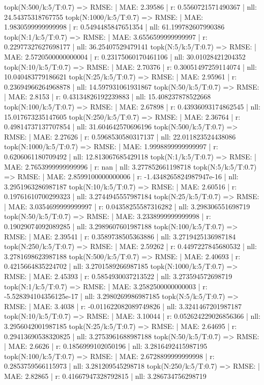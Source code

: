 topk(N:500/k:5/T:0.7) => RMSE: | MAE: 2.39586 | r: 0.5560721571490367 | nll: 24.54375318767755
topk(N:1000/k:5/T:0.7) => RMSE: | MAE: 1.9830599999999998 | r: 0.5494485847651354 | nll: 61.199782607990386
topk(N:1/k:5/T:0.7) => RMSE: | MAE: 3.6556599999999997 | r: 0.22977327627698177 | nll: 36.25407529479141
topk(N:5/k:5/T:0.7) => RMSE: | MAE: 2.5720500000000004 | r: 0.23175060170461106 | nll: 30.01028421204352
topk(N:10/k:5/T:0.7) => RMSE: | MAE: 2.70376 | r: 0.30051497259114074 | nll: 10.040483779186621
topk(N:25/k:5/T:0.7) => RMSE: | MAE: 2.95961 | r: 0.23694966264968878 | nll: 14.597931061931867
topk(N:50/k:5/T:0.7) => RMSE: | MAE: 2.8153 | r: 0.43134826192239883 | nll: 15.408237878522668
topk(N:100/k:5/T:0.7) => RMSE: | MAE: 2.67898 | r: 0.43936093174862545 | nll: 15.017673235147605
topk(N:250/k:5/T:0.7) => RMSE: | MAE: 2.36764 | r: 0.49814737137707854 | nll: 31.604642570696196
topk(N:500/k:5/T:0.7) => RMSE: | MAE: 2.27626 | r: 0.5968530580317137 | nll: 22.011823524438086
topk(N:1000/k:5/T:0.7) => RMSE: | MAE: 1.9998899999999997 | r: 0.6206061180709492 | nll: 12.813067685429118
topk(N:1/k:5/T:0.7) => RMSE: | MAE: 2.7653999999999996 | r: nan | nll: 3.277852661198718
topk(N:5/k:5/T:0.7) => RMSE: | MAE: 2.8599100000000006 | r: -1.4348265824987947e-16 | nll: 3.2951963286987187
topk(N:10/k:5/T:0.7) => RMSE: | MAE: 2.60516 | r: 0.19761610700299323 | nll: 3.2744945557987184
topk(N:25/k:5/T:0.7) => RMSE: | MAE: 3.0354699999999997 | r: 0.04358255587316282 | nll: 3.298306551698719
topk(N:50/k:5/T:0.7) => RMSE: | MAE: 3.2338999999999998 | r: 0.19029074092089285 | nll: 3.2989607601987188
topk(N:100/k:5/T:0.7) => RMSE: | MAE: 2.39541 | r: 0.3589738505363886 | nll: 3.2719425136987184
topk(N:250/k:5/T:0.7) => RMSE: | MAE: 2.59262 | r: 0.4497227845680532 | nll: 3.2781698623987188
topk(N:500/k:5/T:0.7) => RMSE: | MAE: 2.40693 | r: 0.4215664835224702 | nll: 3.2701589266987185
topk(N:1000/k:5/T:0.7) => RMSE: | MAE: 2.45393 | r: 0.5854930037213522 | nll: 3.273594572698719
topk(N:1/k:5/T:0.7) => RMSE: | MAE: 3.2582500000000003 | r: -5.528394104356125e-17 | nll: 3.2980269986987185
topk(N:5/k:5/T:0.7) => RMSE: | MAE: 3.4038 | r: -0.011622082089749826 | nll: 3.3241467201987187
topk(N:10/k:5/T:0.7) => RMSE: | MAE: 3.10044 | r: 0.052624229026856366 | nll: 3.2956042001987185
topk(N:25/k:5/T:0.7) => RMSE: | MAE: 2.64695 | r: 0.29413690538320825 | nll: 3.2753961688987188
topk(N:50/k:5/T:0.7) => RMSE: | MAE: 2.6626 | r: 0.1856999102050196 | nll: 3.2816492415987195
topk(N:100/k:5/T:0.7) => RMSE: | MAE: 2.6728899999999998 | r: 0.2853759566115973 | nll: 3.281209545298718
topk(N:250/k:5/T:0.7) => RMSE: | MAE: 2.82865 | r: 0.41667947328792815 | nll: 3.286734756298719
